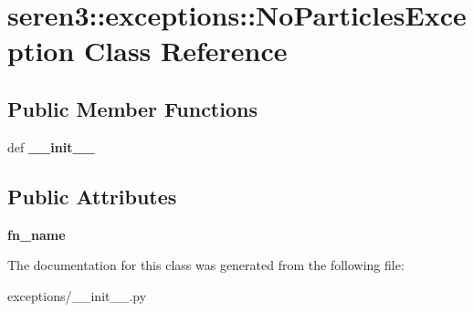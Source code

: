 \hypertarget{classseren3_1_1exceptions_1_1NoParticlesException}{
\section{seren3::exceptions::NoParticlesException Class Reference}
\label{classseren3_1_1exceptions_1_1NoParticlesException}
}
\subsection*{Public Member Functions}
\begin{DoxyCompactItemize}
\item 
\hypertarget{classseren3_1_1exceptions_1_1NoParticlesException_a7bd4e24874448ee3efa401873640f544}{
def {\bfseries \_\-\_\-init\_\-\_\-}}
\label{classseren3_1_1exceptions_1_1NoParticlesException_a7bd4e24874448ee3efa401873640f544}

\end{DoxyCompactItemize}
\subsection*{Public Attributes}
\begin{DoxyCompactItemize}
\item 
\hypertarget{classseren3_1_1exceptions_1_1NoParticlesException_af230323655f6a87256eaeb92d9bb9298}{
{\bfseries fn\_\-name}}
\label{classseren3_1_1exceptions_1_1NoParticlesException_af230323655f6a87256eaeb92d9bb9298}

\end{DoxyCompactItemize}


The documentation for this class was generated from the following file:\begin{DoxyCompactItemize}
\item 
exceptions/\_\-\_\-init\_\-\_\-.py\end{DoxyCompactItemize}
